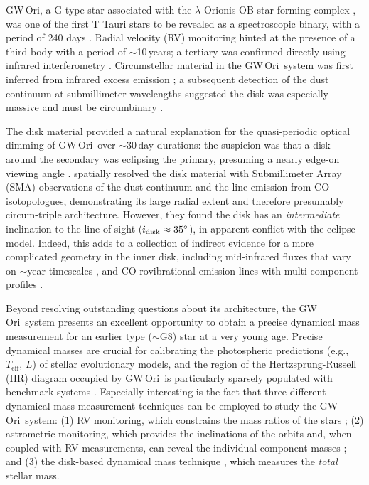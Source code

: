 \documentclass[twocolumn]{aastex61}
\newcommand{\obj}{GW\,Ori}
\begin{document}
\obj, a G-type star associated with the $\lambda$ Orionis OB star-forming complex \citep{dolan00,dolan01,dolan02}, was one of the first T Tauri stars to be revealed as a spectroscopic binary, with a period of 240 days \citep{mathieu91}. Radial velocity (RV) monitoring hinted at the presence of a third body with a period of $\sim$10\,years; a tertiary was confirmed directly using infrared interferometry \citep{berger11}. 
Circumstellar material in the \obj\ system was first inferred from infrared excess emission \citep{mathieu91}; a subsequent detection of the dust continuum at submillimeter wavelengths suggested the disk was especially massive and must be circumbinary \citep[$M_{\rm disk} \gtrsim 0.1 M_\odot$;][]{mathieu95}. 

The disk material provided a natural explanation for the quasi-periodic optical dimming of \obj\ over $\sim$30\,day durations: the suspicion was that a disk around the secondary was eclipsing the primary, presuming a nearly edge-on viewing angle \citep{shevchenko92,shevchenko98}.
\citet{fang17} spatially resolved the disk material with Submillimeter Array (SMA) observations of the dust continuum and the line emission from CO isotopologues, demonstrating its large radial extent and therefore presumably circum-triple architecture.  However, they found the disk has an \emph{intermediate} inclination to the line of sight ($i_\mathrm{disk} \approx 35\mbox{$^\circ$}$), in apparent conflict with the eclipse model. Indeed, this adds to a collection of indirect evidence for a more complicated geometry in the inner disk, including mid-infrared fluxes that vary on $\sim$year timescales \citep{fang14}, and CO rovibrational emission lines with multi-component profiles \citep[which requires a complicated geometry and/or temperature structure in the inner disk;][]{najita03}.

Beyond resolving outstanding questions about its architecture, the \obj\ system presents an excellent opportunity to obtain a precise dynamical mass measurement for an earlier type ($\sim$G8) star at a very young age. Precise dynamical masses are crucial for calibrating the photospheric predictions (e.g., $T_\mathrm{eff}$, $L$) of stellar evolutionary models, and the region of the Hertzsprung-Russell (HR) diagram occupied by \obj\ is particularly sparsely populated with benchmark systems \citep{stassun14}. Especially interesting is the fact that three different dynamical mass measurement techniques can be employed to study the \obj\ system: (1) RV monitoring, which constrains the mass ratios of the stars \citep{mathieu91,fang14}; (2) astrometric monitoring, which provides the inclinations of the orbits and, when coupled with RV measurements, can reveal the individual component masses \citep{berger11}; and (3) the disk-based dynamical mass technique \citep[e.g.,][]{simon00,simon17,rosenfeld12b,czekala15a,czekala16}, which measures the {\it total} stellar mass.
\end{document}
